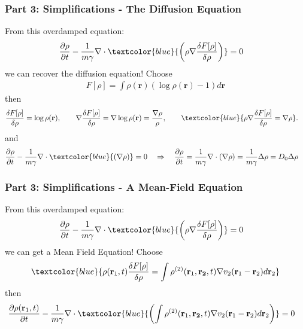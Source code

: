 \documentclass[aspectratio=169,xcolor=dvipsnames]{beamer}
\begin{document}
\begin{frame}
	\frametitle{Part 3: Simplifications - The Diffusion Equation}
	From this overdamped equation:
	\begin{align*}
	&\frac{\partial \rho}{\partial t} -\frac{1}{m \gamma}  \nabla \cdot \textcolor{blue}{\left(\rho \nabla \frac{\delta {F}[\rho]}{\delta \rho}\right)} = 0 
	\end{align*}
	we can recover the diffusion equation! Choose
\begin{align*}
{F}[\rho] =  \int \rho(\mathbf{r}) (\log\rho(\mathbf{r}) -1)d \mathbf{r}
\end{align*}
then
\begin{align*}
\frac{\delta {F}[\rho]}{\delta \rho} &= \log \rho(\mathbf{r}), \qquad
\nabla \frac{\delta {F}[\rho]}{\delta \rho} = \nabla \log \rho(\mathbf{r}) = \frac{\nabla \rho}{\rho}, \qquad
\textcolor{blue}{\rho \nabla \frac{\delta {F}[\rho]}{\delta \rho} = \nabla \rho}. 
\end{align*}
and
\begin{align*}
&\frac{\partial \rho}{\partial t} -\frac{1}{m \gamma}  \nabla \cdot \textcolor{blue}{\left(\nabla \rho\right)} = 0  \quad \Rightarrow \quad \frac{\partial \rho}{\partial t} = \frac{1}{m \gamma} \nabla \cdot \left(\nabla \rho\right)  = \frac{1}{m \gamma}\Delta \rho = D_0 \Delta \rho
\end{align*}
	
\end{frame}
\begin{frame}
	\frametitle{Part 3: Simplifications - A Mean-Field Equation}
	From this overdamped equation:
	\begin{align*}
	&\frac{\partial \rho}{\partial t} -\frac{1}{m \gamma}  \nabla \cdot \textcolor{blue}{\left(\rho \nabla \frac{\delta {F}[\rho]}{\delta \rho}\right)} = 0 
	\end{align*}
	we can get a Mean Field Equation! Choose
	\begin{align*}
	\textcolor{blue}{\rho(\mathbf{r}_1,t) \frac{\delta {F}[\rho]}{\delta \rho}  =  \int \rho^{(2)}(\mathbf{r}_1, \mathbf{r_2},t) \nabla v_2(\mathbf{r}_1 - \mathbf{r}_2) d\mathbf{r}_2}
	\end{align*}
	then
	\begin{align*}
	&\frac{\partial \rho(\mathbf{r}_1,t)}{\partial t} -\frac{1}{m \gamma}  \nabla \cdot {\textcolor{blue}{\left(   \int \rho^{(2)}(\mathbf{r}_1, \mathbf{r_2},t) \nabla v_2(\mathbf{r}_1 - \mathbf{r}_2) d\mathbf{r}_2\right)}} = 0  
	\end{align*}
	
\end{frame}
\end{document}
